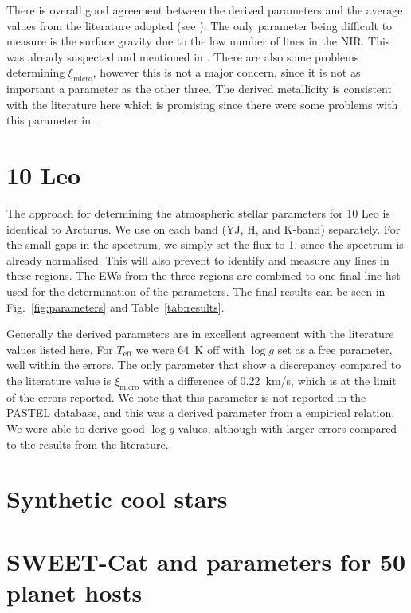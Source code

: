 There is overall good agreement between the derived parameters and the average values from the
literature adopted (see ). The only parameter being difficult to measure is the
surface gravity due to the low number of  lines in the NIR. This was already suspected
and mentioned in . There are also some problems determining
$\xi_\mathrm{micro}$, however this is not a major concern, since it is not as important a parameter
as the other three. The derived metallicity is consistent with the literature here which is promising
since there were some problems with this parameter in .


\section{10 Leo}
\label{sec:10Leo}

The approach for determining the atmospheric stellar parameters for 10 Leo is identical to Arcturus.
We use \ARES on each band (YJ, H, and K-band) separately. For the small gaps in the spectrum, we
simply set the flux to 1, since the spectrum is already normalised. This will also prevent \ARES to
identify and measure any lines in these regions. The EWs from the three regions are combined to one
final line list used for the determination of the parameters. The final results can be seen in
Fig.~\ref{fig:parameters} and Table~\ref{tab:results}.

Generally the derived parameters are in excellent agreement with the literature values listed here.
For $T_\mathrm{eff}$ we were \SI{64}{K} off with $\log g$ set as a free parameter, well within the
errors. The only parameter that show a discrepancy compared to the literature value is
$\xi_\mathrm{micro}$ with a difference of \SI{0.22}{km/s}, which is at the limit of the errors
reported. We note that this parameter is not reported in the PASTEL database, and this was a derived
parameter from a empirical relation. We were able to derive good $\log g$ values, although with
larger errors compared to the results from the literature.


\section{Synthetic cool stars}
\label{sec:synthetic_spectra}



\section{SWEET-Cat and parameters for 50 planet hosts}
\label{sec:SWEET-Cat}




